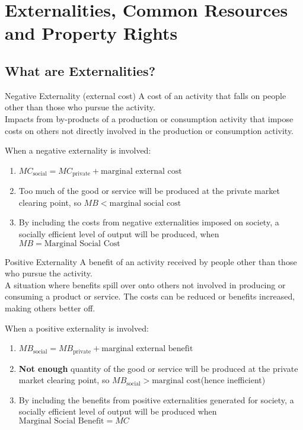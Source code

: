 \section{Externalities, Common Resources and Property Rights}
\subsection{What are Externalities?}
\begin{note}{Negative Externality (external cost)}
	A cost of an activity that falls on people other than those who pursue the activity.\\
	Impacts from by-products of a production or consumption activity that impose costs on others not directly involved in the production or consumption activity.
\end{note}
When a negative externality is involved:
\begin{enumerate}
	\item $MC_\text{social}=MC_\text{private} + \text{marginal external cost}$
	\item Too much of the good or service will be produced at the private market clearing point, so $MB<\text{marginal social cost}$
	\item By including the costs from negative externalities imposed on society, a socially efficient level of output will be produced, when $MB=\text{Marginal Social Cost}$
\end{enumerate}

\begin{note}{Positive Externality}
	A benefit of an activity received by people other than those who pursue the activity.\\
	A situation where benefits spill over onto others not involved in producing or consuming a product or service. The costs can be reduced or benefits increased, making others better off.
\end{note}
When a positive externality is involved:
\begin{enumerate}
	\item $MB_\text{social}=MB_\text{private} + \text{marginal external benefit}$
	\item \textbf{Not enough} quantity of the good or service will be produced at the private market clearing point, so $MB_\text{social}>\text{marginal cost}$(hence inefficient)
	\item By including the benefits from positive externalities generated for society, a socially efficient level of output will be produced when $\text{Marginal Social Benefit} = MC$
\end{enumerate}


